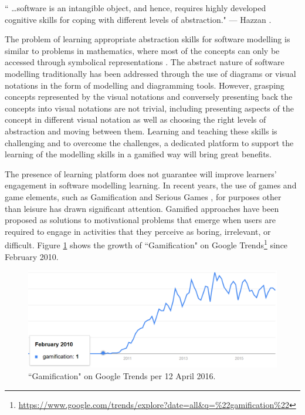 \documentclass[12pt, a4paper]{report} \usepackage[titletoc]{appendix}
\begin{document}
\begin{displayquote}
`` \dots software is an intangible object, and hence, requires highly developed
cognitive skills for coping with different levels of abstraction." --- Hazzan
\cite{hazzan2008reflections}.
\end{displayquote}

The problem of learning appropriate abstraction skills for software modelling is similar to problems in mathematics, where most of the concepts can only be accessed through symbolical representations \cite{Duval2006}. The abstract nature of software modelling traditionally has been addressed through the use of diagrams or visual notations in the form of modelling and diagramming tools. However, grasping concepts represented by the visual notations and conversely presenting back the concepts into visual notations are not trivial, including presenting aspects of the concept in different visual notation as well as choosing the right levels of abstraction and moving between them. Learning and teaching these skills is challenging and to overcome the challenges, a dedicated platform to support the learning of the modelling skills in a gamified way will bring great benefits. 
 
The presence of learning platform does not guarantee will improve learners' engagement in software modelling learning. In recent years, the use of games and game elements, such as Gamification \cite{deterding2011game} and Serious Games \cite{Michael2005}, for purposes other than leisure has drawn significant attention. Gamified approaches have been proposed as solutions to motivational problems that emerge when users are required to engage in activities that they perceive as boring, irrelevant, or difficult. Figure \ref{gamification-trend} shows the growth of ``Gamification" on Google Trends\footnote{\url{https://www.google.com/trends/explore?date=all&q=\%22gamification\%22}}
since February 2010.

\begin{figure}[ht] \centering \includegraphics[width=12cm]{gamification-trend}
\caption{``Gamification" on Google Trends per 12 April 2016.}
\label{gamification-trend}
\end{figure}
\end{document}

